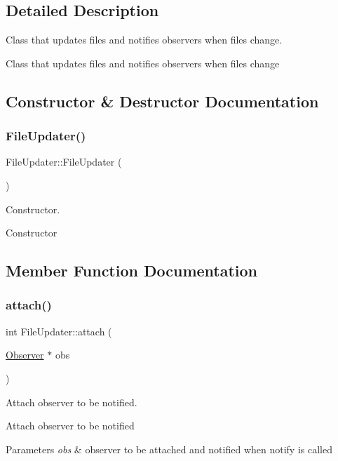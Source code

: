 \subsection{Detailed Description}
Class that updates files and notifies observers when files change. 

Class that updates files and notifies observers when files change 

\subsection{Constructor \& Destructor Documentation}
\mbox{\label{classFileUpdater_affee5812616d6fe3b91eff20ec2b2549}} 
\subsubsection{\texorpdfstring{FileUpdater()}{FileUpdater()}}
{\footnotesize\ttfamily File\+Updater\+::\+File\+Updater (\begin{DoxyParamCaption}{ }\end{DoxyParamCaption})}



Constructor. 

Constructor 

\subsection{Member Function Documentation}
\mbox{\label{classFileUpdater_a0f7a5affde147f2af23230f4f8133e27}} 
\subsubsection{\texorpdfstring{attach()}{attach()}}
{\footnotesize\ttfamily int File\+Updater\+::attach (\begin{DoxyParamCaption}\item[{\mbox{\hyperlink{classObserver}{Observer}} $\ast$}]{obs }\end{DoxyParamCaption})}



Attach observer to be notified. 

Attach observer to be notified 
\begin{DoxyParams}{Parameters}
{\em obs} & observer to be attached and notified when notify is called \\
\hline
\end{DoxyParams}
\mbox{\label{classFileUpdater_abee3c10c5898a48a8aeaeb374aba8b6d}} 
